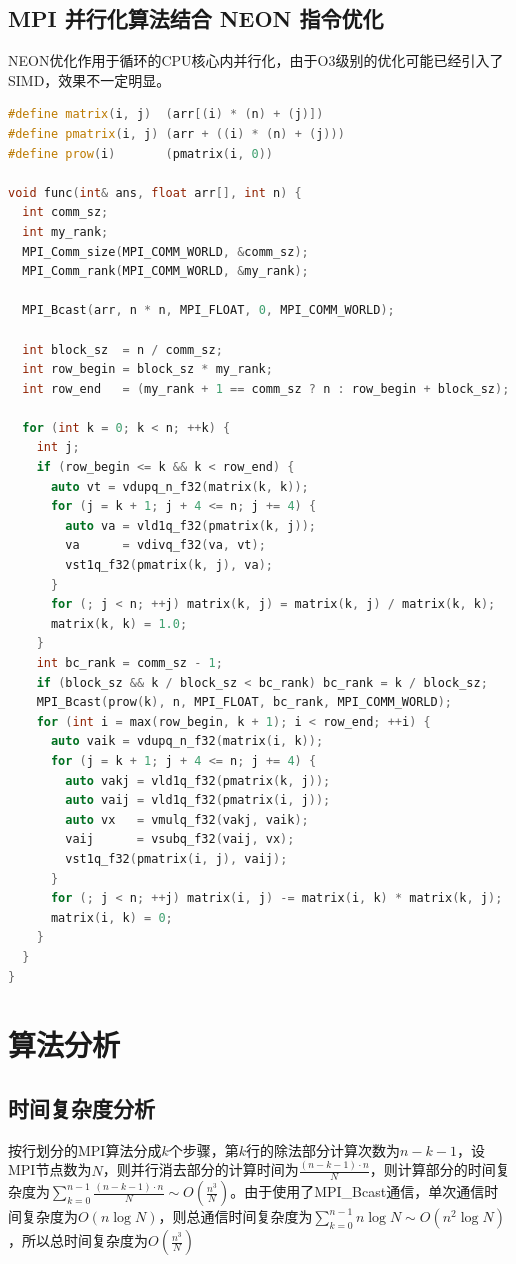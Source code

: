 \documentclass[a4paper]{article}
\begin{document}
\subsection{MPI 并行化算法结合 NEON 指令优化}
NEON优化作用于循环的CPU核心内并行化，由于O3级别的优化可能已经引入了SIMD，效果不一定明显。
\begin{lstlisting}[frame=trbl,language={C++}]
#define matrix(i, j)  (arr[(i) * (n) + (j)])
#define pmatrix(i, j) (arr + ((i) * (n) + (j)))
#define prow(i)       (pmatrix(i, 0))

void func(int& ans, float arr[], int n) {
  int comm_sz;
  int my_rank;
  MPI_Comm_size(MPI_COMM_WORLD, &comm_sz);
  MPI_Comm_rank(MPI_COMM_WORLD, &my_rank);

  MPI_Bcast(arr, n * n, MPI_FLOAT, 0, MPI_COMM_WORLD);

  int block_sz  = n / comm_sz;
  int row_begin = block_sz * my_rank;
  int row_end   = (my_rank + 1 == comm_sz ? n : row_begin + block_sz);

  for (int k = 0; k < n; ++k) {
    int j;
    if (row_begin <= k && k < row_end) {
      auto vt = vdupq_n_f32(matrix(k, k));
      for (j = k + 1; j + 4 <= n; j += 4) {
        auto va = vld1q_f32(pmatrix(k, j));
        va      = vdivq_f32(va, vt);
        vst1q_f32(pmatrix(k, j), va);
      }
      for (; j < n; ++j) matrix(k, j) = matrix(k, j) / matrix(k, k);
      matrix(k, k) = 1.0;
    }
    int bc_rank = comm_sz - 1;
    if (block_sz && k / block_sz < bc_rank) bc_rank = k / block_sz;
    MPI_Bcast(prow(k), n, MPI_FLOAT, bc_rank, MPI_COMM_WORLD);
    for (int i = max(row_begin, k + 1); i < row_end; ++i) {
      auto vaik = vdupq_n_f32(matrix(i, k));
      for (j = k + 1; j + 4 <= n; j += 4) {
        auto vakj = vld1q_f32(pmatrix(k, j));
        auto vaij = vld1q_f32(pmatrix(i, j));
        auto vx   = vmulq_f32(vakj, vaik);
        vaij      = vsubq_f32(vaij, vx);
        vst1q_f32(pmatrix(i, j), vaij);
      }
      for (; j < n; ++j) matrix(i, j) -= matrix(i, k) * matrix(k, j);
      matrix(i, k) = 0;
    }
  }
}
\end{lstlisting}

\section{算法分析}
\subsection{时间复杂度分析}
按行划分的MPI算法分成$k$个步骤，第$k$行的除法部分计算次数为$n-k-1$，设MPI节点数为$N$，则并行消去部分的计算时间为$\frac{(n-k-1) \cdot n}{N}$，则计算部分的时间复杂度为$\sum_{k=0}^{n-1}\frac{(n-k-1) \cdot n}{N} \sim O(\frac{n^3}{N})$。由于使用了MPI\_Bcast通信，单次通信时间复杂度为$O(n\log{N})$，则总通信时间复杂度为$\sum_{k=0}^{n-1}n\log{N} \sim O(n^2\log{N})$，所以总时间复杂度为$O(\frac{n^3}{N})$
\end{document}

